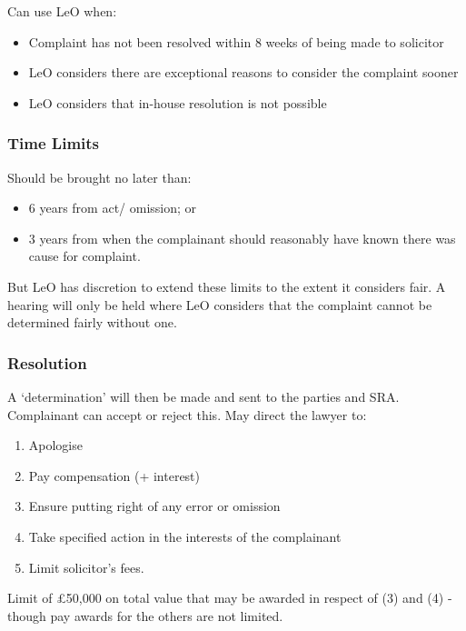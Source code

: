 \documentclass[
]{article}
\providecommand{\tightlist}{%
  \setlength{\itemsep}{0pt}\setlength{\parskip}{0pt}}
\begin{document}
Can use LeO when:

\begin{itemize}
\tightlist
\item
  Complaint has not been resolved within 8 weeks of being made to
  solicitor
\item
  LeO considers there are exceptional reasons to consider the complaint
  sooner
\item
  LeO considers that in-house resolution is not possible
\end{itemize}

\hypertarget{time-limits}{%
\subsubsection{Time Limits}\label{time-limits}}

Should be brought no later than:

\begin{itemize}
\tightlist
\item
  6 years from act/ omission; or
\item
  3 years from when the complainant should reasonably have known there
  was cause for complaint.
\end{itemize}

But LeO has discretion to extend these limits to the extent it considers
fair. A hearing will only be held where LeO considers that the complaint
cannot be determined fairly without one.

\hypertarget{resolution}{%
\subsubsection{Resolution}\label{resolution}}

A `determination' will then be made and sent to the parties and SRA.
Complainant can accept or reject this. May direct the lawyer to:

\begin{enumerate}
\def\labelenumi{\arabic{enumi}.}
\tightlist
\item
  Apologise
\item
  Pay compensation (+ interest)
\item
  Ensure putting right of any error or omission
\item
  Take specified action in the interests of the complainant
\item
  Limit solicitor's fees.
\end{enumerate}

Limit of £50,000 on total value that may be awarded in respect of (3)
and (4) - though pay awards for the others are not limited.
\end{document}
